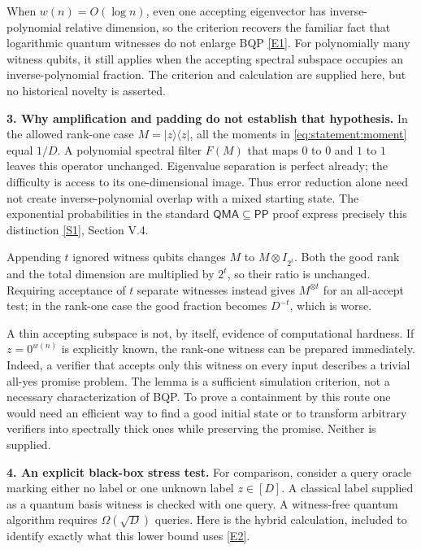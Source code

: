 \documentclass[11pt,a4paper]{article}
\newcommand{\sref}[2]{\hyperlink{source:#1:#2}{[S#2]}}
\newcommand{\eref}[2]{\hyperlink{extra:#1:#2}{[E#2]}}
\numberwithin{equation}{section}
\begin{document}
When $w(n)=O(\log n)$, even one accepting eigenvector has inverse-polynomial
relative dimension, so the criterion recovers the familiar fact that
logarithmic quantum witnesses do not enlarge BQP \eref{statement}{1}. For
polynomially many witness qubits, it still applies when the accepting
spectral subspace occupies an inverse-polynomial fraction. The criterion
and calculation are supplied here, but no historical novelty is asserted.

\textbf{3. Why amplification and padding do not establish that hypothesis.}
In the allowed rank-one case $M=|z\rangle\langle z|$, all the moments in
\eqref{eq:statement:moment} equal $1/D$. A polynomial spectral filter $F(M)$
that maps $0$ to $0$ and $1$ to $1$ leaves this operator unchanged.
Eigenvalue separation is perfect already; the difficulty is access to its
one-dimensional image. Thus error reduction alone need not create
inverse-polynomial overlap with a mixed starting state. The exponential
probabilities in the standard $\mathsf{QMA}\subseteq\mathsf{PP}$ proof
express precisely this distinction \sref{statement}{1}, Section V.4.

Appending $t$ ignored witness qubits changes $M$ to $M\otimes I_{2^t}$.
Both the good rank and the total dimension are multiplied by $2^t$, so
their ratio is unchanged. Requiring acceptance of $t$ separate witnesses
instead gives $M^{\otimes t}$ for an all-accept test; in the rank-one case
the good fraction becomes $D^{-t}$, which is worse.

A thin accepting subspace is not, by itself, evidence of computational
hardness. If $z=0^{w(n)}$ is explicitly known, the rank-one witness can be
prepared immediately. Indeed, a verifier that accepts only this witness on
every input describes a trivial all-yes promise problem. The lemma is a
sufficient simulation criterion, not a necessary characterization of BQP.
To prove a containment by this route one would need an efficient way to
find a good initial state or to transform arbitrary verifiers into
spectrally thick ones while preserving the promise. Neither is supplied.

\textbf{4. An explicit black-box stress test.}
For comparison, consider a query oracle marking either no label or one
unknown label $z\in[D]$. A classical label supplied as a quantum basis
witness is checked with one query. A witness-free quantum algorithm requires
$\Omega(\sqrt D)$ queries. Here is the hybrid calculation, included to
identify exactly what this lower bound uses \eref{statement}{2}.
\end{document}
